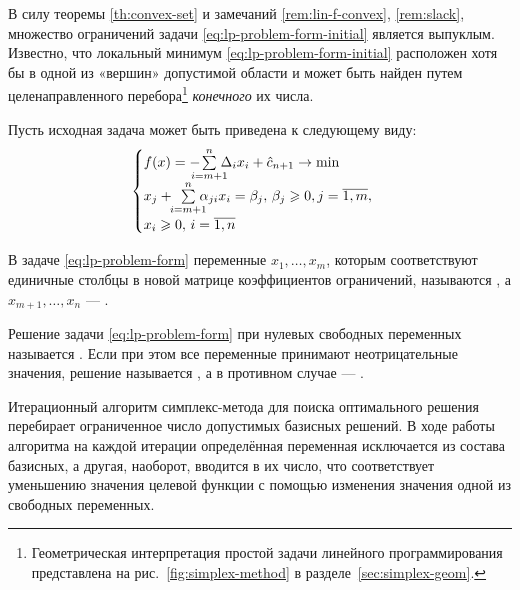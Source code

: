 \begin{rem}
  В силу теоремы \ref{th:convex-set} и замечаний
  \ref{rem:lin-f-convex}, \ref{rem:slack}, множество ограничений
  задачи \eqref{eq:lp-problem-form-initial} является выпуклым.
  Известно, что локальный минимум \eqref{eq:lp-problem-form-initial}
  расположен хотя бы в одной из «вершин» допустимой области и может
  быть найден путем целенаправленного перебора\footnote{Геометрическая
    интерпретация простой задачи линейного программирования
    представлена на рис. \ref{fig:simplex-method} в
    разделе \ref{sec:simplex-geom}.} \emph{конечного} их числа.
\end{rem}

Пусть исходная задача может быть приведена к следующему виду:
\begin{equation}
  \label{eq:lp-problem-form}
  \begin{cases}
    f(x) = -{\!\!\!\!\suml_{i={m+1}}^n{\!\!\!\!\Delta_{i} x_i}} + \hat{c}_{n+1} \to \min \\
    x_j + \!\! \suml_{i=m+1}^n {\!\!\!\!\alpha_{ji} x_i} = \beta_j,\,
    \beta_j \geq 0, j = \overline{1, m},\\
    x_i \geq 0,\, i = \overline{1, n}
  \end{cases}
\end{equation}

\begin{dfn}
  В задаче \eqref{eq:lp-problem-form} переменные $x_1, \dotsc, x_m$,
  которым соответствуют единичные столбцы в новой матрице
  коэффициентов ограничений, называются , а
  $x_{m+1}, \dotsc, x_n$ — .
\end{dfn}

\begin{dfn}
  Решение задачи \eqref{eq:lp-problem-form} при нулевых свободных
  переменных называется . Если при этом все
  переменные принимают неотрицательные значения, решение называется
  , а в противном случае — .
\end{dfn}

Итерационный алгоритм симплекс-метода для поиска оптимального решения
перебирает ограниченное число допустимых базисных решений. В ходе
работы алгоритма на каждой итерации определённая переменная
исключается из состава базисных, а другая, наоборот, вводится в их
число, что соответствует уменьшению значения целевой функции с помощью
изменения значения одной из свободных переменных.

